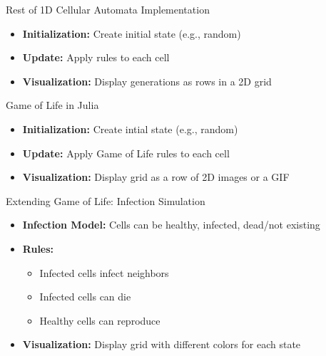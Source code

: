 \begin{frame}{Rest of 1D Cellular Automata Implementation}
    \begin{itemize}
        \item \textbf{Initialization:} Create initial state (e.g., random)
        \item \textbf{Update:} Apply rules to each cell
        \item \textbf{Visualization:} Display generations as rows in a 2D grid
    \end{itemize}
\end{frame}

\begin{frame}{Game of Life in Julia}
    \begin{itemize}
        \item \textbf{Initialization:} Create intial state (e.g., random)
        \item \textbf{Update:} Apply Game of Life rules to each cell
        \item \textbf{Visualization:} Display grid as a row of 2D images or a GIF
    \end{itemize}

\end{frame}

\begin{frame}{Extending Game of Life: Infection Simulation}
    \begin{itemize}
        \item \textbf{Infection Model:} Cells can be healthy, infected, dead/not existing
        \item \textbf{Rules:}
              \begin{itemize}
                  \item Infected cells infect neighbors
                  \item Infected cells can die
                  \item Healthy cells can reproduce
              \end{itemize}
        \item \textbf{Visualization:} Display grid with different colors for each state
    \end{itemize}

\end{frame}


